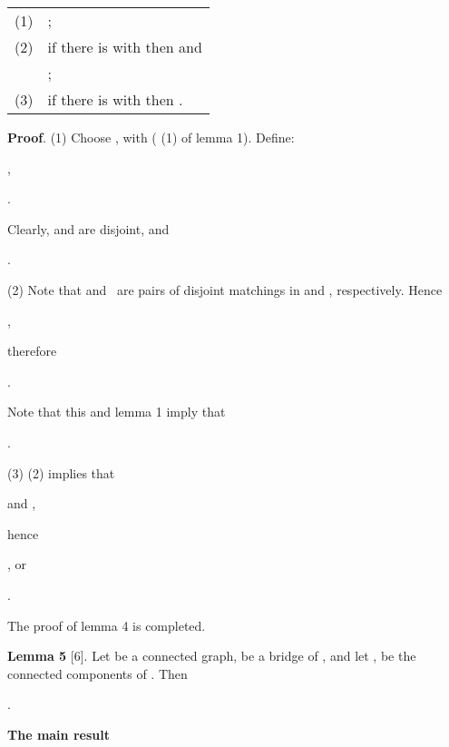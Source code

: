 \documentclass{article}
\begin{document}
\begin{tabular}{ll}
(1) & ; \\ 
(2) & if there is  with then  and \\ 
& ; \\ 
(3) & if there is  with  then 
.\end{tabular}

\textbf{Proof}. (1) Choose ,  with  ( (1) of lemma 1). Define:

\begin{center}
,

.
\end{center}

Clearly,  and  are disjoint, and

\begin{center}
.
\end{center}

(2) Note that  and \ are pairs of disjoint matchings in  and , respectively. Hence

\begin{center}


,
\end{center}

therefore

\begin{center}
.
\end{center}

Note that this and lemma 1 imply that

\begin{center}
.
\end{center}

(3) (2) implies that

\begin{center}
 and ,
\end{center}

hence

\begin{center}
, or

.
\end{center}

The proof of lemma 4 is completed.

\textbf{Lemma 5 }[6]. Let  be a connected graph,  be a bridge of ,
and let ,  be the connected components of . Then

\begin{center}
.
\end{center}

\bigskip

\begin{center}
\textbf{The main result}
\end{center}
\end{document}
